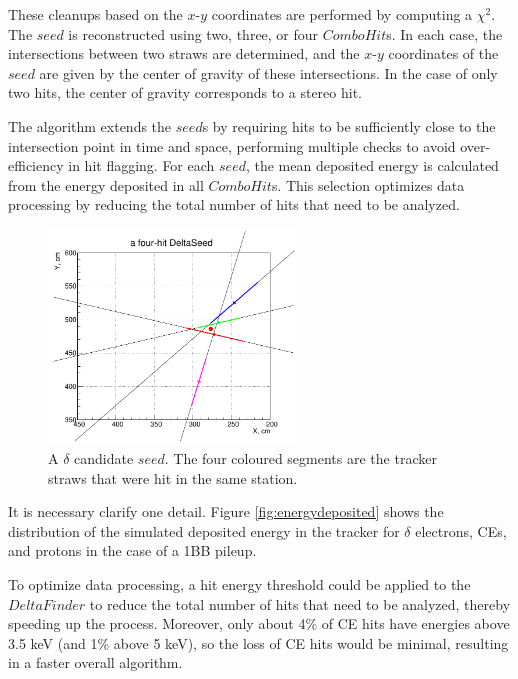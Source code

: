 These cleanups based on the $x$-$y$ 
coordinates are performed 
by computing a $\chi^2$. The $seed$ 
is reconstructed using 
two, three, or four $ComboHit$s. 
In each case, the 
intersections between two straws 
are determined, 
and the $x$-$y$ coordinates of 
the $seed$ are given 
by the center of gravity of 
these intersections. 
In the case of only two hits, 
the center of gravity 
corresponds to a stereo hit. 

The algorithm extends the $seed$s by requiring 
hits to be sufficiently close to the intersection 
point in time and space, performing multiple checks 
to avoid over-efficiency in 
hit flagging. For each $seed$, 
the mean deposited energy is calculated from the energy 
deposited in all $ComboHit$s. 
This selection optimizes data processing by 
reducing the total number of hits that need to be analyzed.

\begin{figure}[!h]
    \centering
    \includegraphics[width =0.6\textwidth]{figures/png/Screenshot_20240811_115854.png}
    \caption[A $\delta$ candidate $seed$.]{A 
    $\delta$ candidate $seed$. The four 
    coloured segments are the tracker straws that were
    hit in the same station.}
    \label{fig:deltaseeds}
\end{figure}

It is necessary clarify one detail. 
Figure \ref{fig:energydeposited} shows the 
distribution of the simulated deposited energy 
in the tracker for $\delta$ electrons, CEs, and 
protons in the case of a 1BB pileup. 

To optimize data processing, a hit energy 
threshold could be applied to the $DeltaFinder$ 
to reduce the total number of hits that 
need to be analyzed, thereby speeding up the process. Moreover, only about 
4\% of CE hits have energies above 3.5 keV 
(and 1\% above 5 keV), so the loss of CE 
hits would be minimal, resulting in a 
faster overall algorithm. 

